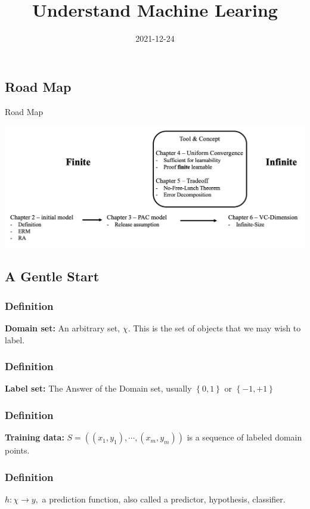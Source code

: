 \documentclass[xcolor=dvipsnames]{beamer}
\title{Understand Machine Learing}
\author{}
\institute{}
\date{2021-12-24}
\theoremstyle{plain}
\newcommand{\sett}[1]{\left\{#1 \right\}}
\begin{document}
	\begin{frame}
    	\titlepage 
	\end{frame}
\begin{frame}
	\tableofcontents	
\end{frame}


\begin{frame}
	\section{Road Map}
	Road Map
	
	\begin{center}
		\includegraphics[scale = 0.25]{./figure/0-1.png}
	\end{center}
    
\end{frame}

\begin{frame}
	\section{A Gentle Start}
	\frametitle{Definition}
	\textbf{Domain set:} An arbitrary set, $\chi$. This is the set of objects that we may wish to label.
\end{frame}

\begin{frame}
	\frametitle{Definition}
	\textbf{Label set:} The Answer of the Domain set, usually $\sett{0,1}$ or $\sett{-1,+1}$
\end{frame}

\begin{frame}
	\frametitle{Definition}
	\textbf{Training data:} $S = ((x_1,y_1),\cdots,(x_m,y_m))$ is a sequence of labeled domain points.
\end{frame}

\begin{frame}
	\frametitle{Definition}
	$h:\chi \rightarrow y,$ a prediction function, also called a predictor, hypothesis, classifier.
\end{frame}
\end{document}
